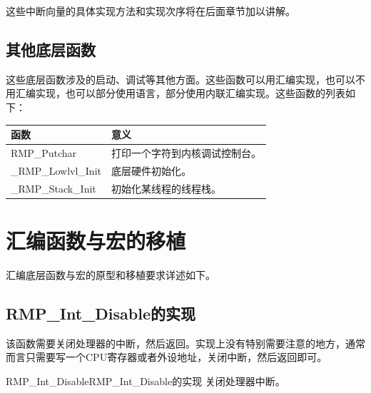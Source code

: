 这些中断向量的具体实现方法和实现次序将在后面章节加以讲解。

\subsection{其他底层函数}\label{subsec:other-low-level-functions}

这些底层函数涉及的启动、调试等其他方面。这些函数可以用汇编实现，也可以不用汇编实现，也可以部分使用语言，部分使用内联汇编实现。这些函数的列表如下：

\label{tab:overview-of-other-low-level-functions}

{\def\LTcaptype{none} %
\begin{longtable}[]{@{}
  >{\raggedright\arraybackslash}p{}
  >{\raggedright\arraybackslash}p{}@{}}
\toprule\noalign{}
\begin{minipage}[b]{\linewidth}\raggedright
函数
\end{minipage} & \begin{minipage}[b]{\linewidth}\raggedright
意义
\end{minipage} \\
\midrule\noalign{}
\endhead
\bottomrule\noalign{}
\endlastfoot
RMP\_Putchar & 打印一个字符到内核调试控制台。 \\
\_RMP\_Lowlvl\_Init & 底层硬件初始化。 \\
\_RMP\_Stack\_Init & 初始化某线程的线程栈。 \\
\end{longtable}
}

\section{汇编函数与宏的移植}\label{sec:porting-the-assembly-functions-and-macros}

汇编底层函数与宏的原型和移植要求详述如下。

\subsection{RMP\_Int\_Disable的实现}\label{subsec:implementation-of-rmp-int-disable}

该函数需要关闭处理器的中断，然后返回。实现上没有特别需要注意的地方，通常而言只需要写一个CPU寄存器或者外设地址，关闭中断，然后返回即可。

\begin{apidesc}{RMP\_Int\_Disable}{RMP\_Int\_Disable的实现}
    关闭处理器中断。
    \begin{apiparams}
    \end{apiparams}
    \begin{apiret}
    \end{apiret}
\end{apidesc}

